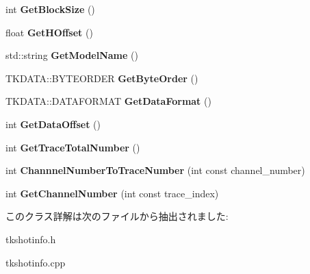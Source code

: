 \begin{DoxyCompactItemize}
\item 
\mbox{\label{class_t_k_d_a_t_a_a5fe237cba051e352845786e13c0cd54f}} 
int {\bfseries Get\+Block\+Size} ()
\item 
\mbox{\label{class_t_k_d_a_t_a_ac823854fcfb02d7788ec491b38f4d615}} 
float {\bfseries Get\+H\+Offset} ()
\item 
\mbox{\label{class_t_k_d_a_t_a_af0a676448ec4d492290517a7e60a2de3}} 
std\+::string {\bfseries Get\+Model\+Name} ()
\item 
\mbox{\label{class_t_k_d_a_t_a_a63437cd1b2448b0b54ee6ec56da1321e}} 
T\+K\+D\+A\+T\+A\+::\+B\+Y\+T\+E\+O\+R\+D\+ER {\bfseries Get\+Byte\+Order} ()
\item 
\mbox{\label{class_t_k_d_a_t_a_a86117b4edecbf2e3013973fb016877e2}} 
T\+K\+D\+A\+T\+A\+::\+D\+A\+T\+A\+F\+O\+R\+M\+AT {\bfseries Get\+Data\+Format} ()
\item 
\mbox{\label{class_t_k_d_a_t_a_a11fad512e15a5b8dd7be2ff786d5fd8e}} 
int {\bfseries Get\+Data\+Offset} ()
\item 
\mbox{\label{class_t_k_d_a_t_a_a0e9270376ed47917048fdd38f2f4a81d}} 
int {\bfseries Get\+Trace\+Total\+Number} ()
\item 
\mbox{\label{class_t_k_d_a_t_a_ad70108b9612759566d7cc90e60f293c5}} 
int {\bfseries Channnel\+Number\+To\+Trace\+Number} (int const channel\+\_\+number)
\item 
\mbox{\label{class_t_k_d_a_t_a_a8282e57fcee3618dfe533b6771adce96}} 
int {\bfseries Get\+Channel\+Number} (int const trace\+\_\+index)
\end{DoxyCompactItemize}


このクラス詳解は次のファイルから抽出されました\+:\begin{DoxyCompactItemize}
\item 
tkshotinfo.\+h\item 
tkshotinfo.\+cpp\end{DoxyCompactItemize}
